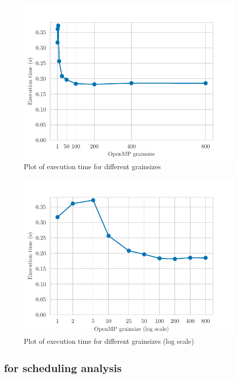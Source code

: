 \begin{figure}[H]
    \centering
    \includegraphics{plots/grainsize.pdf}
    \caption{Plot of execution time for different grainsizes}
    \label{fig:grain} 
\end{figure}

\begin{figure}[H]
    \centering
    \includegraphics{plots/grainsize_log.pdf}
    \caption{Plot of execution time for different grainsizes (log scale)}
    \label{fig:grain_log} 
\end{figure}

\subsection{for scheduling analysis}

